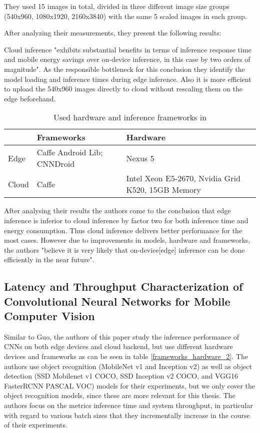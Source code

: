 They used 15 images in total, divided in three different image size groups (540x960, 1080x1920, 2160x3840) with the same 5 scaled images in each group.

After analyzing their measurements, they present the following results:

Cloud inference "exhibits substantial benefits
in terms of inference response time and mobile energy savings
over on-device inference, in this case by two orders of magnitude". As the responsible bottleneck for this conclusion they identify the model loading and inference times during edge inference.
Also it is more efficient to upload the 540x960 images directly to cloud without rescaling them on the edge beforehand.


\begin{table}[H]
\centering
\caption{Used hardware and inference frameworks in \cite{DBLP:conf/ic2e/Guo18}}
\begin{tabular}{@{}lll@{}}
\toprule
 & Frameworks & Hardware \\
 \midrule
Edge & Caffe Android Lib; CNNDroid & Nexus 5 \\
Cloud & Caffe & Intel Xeon E5-2670, Nvidia Grid K520, 15GB Memory\\
\bottomrule

\end{tabular}

\label{frameworks_hardware_1}
\end{table}
After analysing their results the authors come to the conclusion that edge inference is inferior to cloud inference by factor two for both inference time and energy consumption. Thus cloud inference delivers better performance for the most cases. However due to improvements in models, hardware and frameworks, the authors "believe it is
very likely that on-device[edge] inference can be done efficiently in the near future". 
\subsection{Latency and Throughput Characterization of Convolutional
Neural Networks for Mobile Computer Vision}
Similar to Guo, the authors of this paper study the inference performance of CNNs on both edge devices and cloud backend, but use different hardware devices and frameworks as can be seen in table \ref{frameworks_hardware_2}. 
The authors use object recognition (MobileNet v1 and Inception v2) as well as object detection (SSD Mobilenet v1 COCO, SSD Inception v2 COCO,
and VGG16 FasterRCNN PASCAL VOC) models for their experiments, but we only cover the object recognition models, since these are more relevant for this thesis.
The authors focus on the metrics inference time and system throughput, in particular with regard to various batch sizes that they incrementally increase in the course of their experiments.

